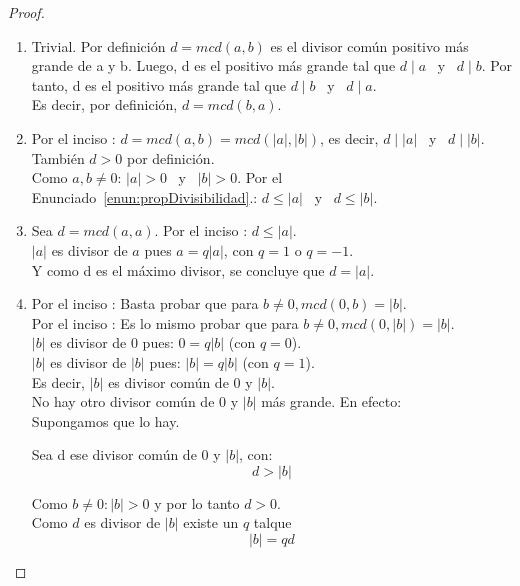 \begin{proof}
\begin{enumerate}[label=\roman*)]
$|a| = 
\begin{cases}
  a, & \text{si } a \geq 0, \\
  -a, & \text{si } a < 0.
\end{cases}$ 
\setcounter{enumi}{2}
\item Trivial. Por definición $d = mcd(a,b)$ es el divisor común positivo más grande de a y b. Luego, d es el positivo más grande tal que $d \mid a$ \, y \, $d \mid b$. Por tanto, d es el positivo más grande tal que $d \mid b$ \, y \, $d \mid a$.\\
Es decir, por definición, $d = mcd(b,a)$. 
\item  \setcounter{enumi}{2}
Por el inciso : $d = mcd(a,b) = mcd(|a|,|b|)$, es decir, $d \mid |a|$ \, y \, $d \mid |b|$. También $d > 0$ por definición. \\
Como $a,b \neq 0$: $|a| > 0$ \, y \, $|b| > 0$. Por el Enunciado~\ref{enun:propDivisibilidad}.: $d \leq |a|$ \,  y \, $d \leq |b|$. 
\setcounter{enumi}{4}
\item  
Sea $d = mcd(a,a)$. Por el inciso : $d \leq |a|$. \\
$|a|$ es divisor de $a$ pues $a = q|a|$, con $q = 1$ o $q = -1$. \\
Y como d es el máximo divisor, se concluye que $d = |a|$. 
\item \setcounter{enumi}{3} 
Por el inciso : Basta probar que para $b \neq 0, mcd(0,b) = |b|$. \\
\setcounter{enumi}{2}
Por el inciso : Es lo mismo probar que para $b \neq 0, mcd(0,|b|) = |b|$. \\
$|b|$ es divisor de $0$ pues: $0 = q|b|$ (con $q = 0$). \\
$|b|$ es divisor de $|b|$ pues: $|b| = q|b|$ (con $q = 1$). \\
Es decir, $|b|$ es divisor común de 0 y $|b|$. \\
No hay otro divisor común de 0 y $|b|$ más grande. En efecto:\\
Supongamos que lo hay. 

Sea d ese divisor común de 0 y $|b|$, con:
\begin{equation}
\label{eq343}
d > |b| 
\end{equation}


Como $b \neq 0: |b| > 0$ y por lo tanto $d > 0$. \\
Como $d$ es divisor de $|b|$ existe un $q$ talque
\begin{equation}
\label{eq351}
    |b| = qd
\end{equation}


\end{enumerate}
\end{proof}
